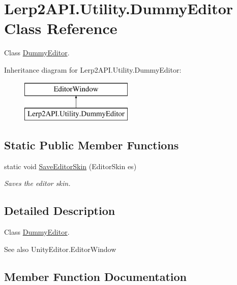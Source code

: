 \hypertarget{class_lerp2_a_p_i_1_1_utility_1_1_dummy_editor}{}\section{Lerp2\+A\+P\+I.\+Utility.\+Dummy\+Editor Class Reference}
\label{class_lerp2_a_p_i_1_1_utility_1_1_dummy_editor}


Class \hyperlink{class_lerp2_a_p_i_1_1_utility_1_1_dummy_editor}{Dummy\+Editor}.  


Inheritance diagram for Lerp2\+A\+P\+I.\+Utility.\+Dummy\+Editor\+:\begin{figure}[H]
\begin{center}
\leavevmode
\includegraphics[height=2.000000cm]{class_lerp2_a_p_i_1_1_utility_1_1_dummy_editor}
\end{center}
\end{figure}
\subsection*{Static Public Member Functions}
\begin{DoxyCompactItemize}
\item 
static void \hyperlink{class_lerp2_a_p_i_1_1_utility_1_1_dummy_editor_abec36c47d42187ca176f1aa00265a30a}{Save\+Editor\+Skin} (Editor\+Skin es)
\begin{DoxyCompactList}\small\item\em Saves the editor skin. \end{DoxyCompactList}\end{DoxyCompactItemize}


\subsection{Detailed Description}
Class \hyperlink{class_lerp2_a_p_i_1_1_utility_1_1_dummy_editor}{Dummy\+Editor}. 

\begin{DoxySeeAlso}{See also}
Unity\+Editor.\+Editor\+Window


\end{DoxySeeAlso}


\subsection{Member Function Documentation}
\mbox{\label{class_lerp2_a_p_i_1_1_utility_1_1_dummy_editor_abec36c47d42187ca176f1aa00265a30a}} 
